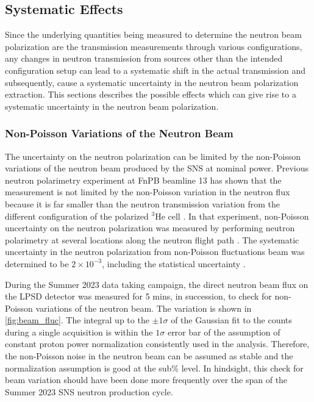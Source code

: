 \subsection{Systematic Effects}

Since the underlying quantities being measured to determine the neutron beam polarization are the transmission measurements through various configurations, any changes in neutron transmission from sources other than the intended configuration setup can lead to a systematic shift in the actual transmission and subsequently, cause a systematic uncertainty in the neutron beam polarization extraction. This sections describes the possible effects which can give rise to a systematic uncertainty in the neutron beam polarization.

\subsubsection{Non-Poisson Variations of the Neutron Beam}

The uncertainty on the neutron polarization can be limited by the non-Poisson variations of the neutron beam produced by the SNS at nominal power. Previous neutron polarimetry experiment at FnPB beamline 13 has shown that the measurement is not limited by the non-Poisson variation in the neutron flux because it is far smaller than the neutron transmission variation from the different configuration of the polarized $^3$He cell \cite{Musgrave2018}. In that experiment, non-Poisson uncertainty on the neutron polarization was measured by performing neutron polarimetry at several locations along the neutron flight path \cite{Musgrave2018}. The systematic uncertainty in the neutron polarization from non-Poisson fluctuations beam was determined to be $2 \times 10^{-3}$, including the statistical uncertainty \cite{Musgrave2018}. 

During the Summer 2023 data taking campaign, the direct neutron beam flux on the LPSD detector was measured for 5 mins, in succession, to check for non-Poisson variations of the neutron beam. The variation is shown in \cref{fig:beam_fluc}. The integral up to the $\pm 1\sigma$ of the Gaussian fit to the counts during a single acquisition is within the $1\sigma$ error bar of the assumption of constant proton power normalization consistently used in the analysis. Therefore, the non-Poisson noise in the neutron beam can be assumed as stable and the normalization assumption is good at the sub\% level. In hindsight, this check for beam variation should have been done more frequently over the span of the Summer 2023 SNS neutron production cycle.  

